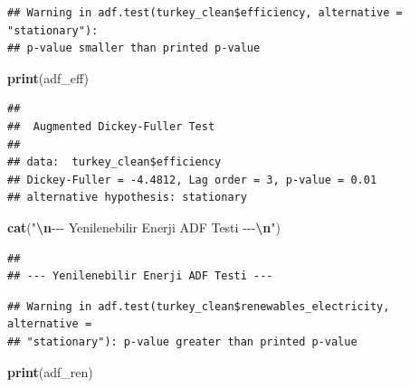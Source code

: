 \documentclass[
]{article}
\newenvironment{Shaded}{\begin{snugshade}}{\end{snugshade}}
\newcommand{\AttributeTok}[1]{\textcolor[rgb]{0.13,0.29,0.53}{#1}}
\newcommand{\FunctionTok}[1]{\textcolor[rgb]{0.13,0.29,0.53}{\textbf{#1}}}
\newcommand{\NormalTok}[1]{#1}
\newcommand{\OtherTok}[1]{\textcolor[rgb]{0.56,0.35,0.01}{#1}}
\newcommand{\SpecialCharTok}[1]{\textcolor[rgb]{0.81,0.36,0.00}{\textbf{#1}}}
\newcommand{\StringTok}[1]{\textcolor[rgb]{0.31,0.60,0.02}{#1}}
\begin{document}
\begin{verbatim}
## Warning in adf.test(turkey_clean$efficiency, alternative = "stationary"):
## p-value smaller than printed p-value
\end{verbatim}

\begin{Shaded}
\begin{Highlighting}[]
\FunctionTok{print}\NormalTok{(adf\_eff)}
\end{Highlighting}
\end{Shaded}

\begin{verbatim}
## 
##  Augmented Dickey-Fuller Test
## 
## data:  turkey_clean$efficiency
## Dickey-Fuller = -4.4812, Lag order = 3, p-value = 0.01
## alternative hypothesis: stationary
\end{verbatim}

\begin{Shaded}
\begin{Highlighting}[]
\FunctionTok{cat}\NormalTok{(}\StringTok{"}\SpecialCharTok{\textbackslash{}n}\StringTok{{-}{-}{-} Yenilenebilir Enerji ADF Testi {-}{-}{-}}\SpecialCharTok{\textbackslash{}n}\StringTok{"}\NormalTok{)}
\end{Highlighting}
\end{Shaded}

\begin{verbatim}
## 
## --- Yenilenebilir Enerji ADF Testi ---
\end{verbatim}

\begin{Shaded}
\end{Shaded}

\begin{verbatim}
## Warning in adf.test(turkey_clean$renewables_electricity, alternative =
## "stationary"): p-value greater than printed p-value
\end{verbatim}

\begin{Shaded}
\begin{Highlighting}[]
\FunctionTok{print}\NormalTok{(adf\_ren)}
\end{Highlighting}
\end{Shaded}
\end{document}
